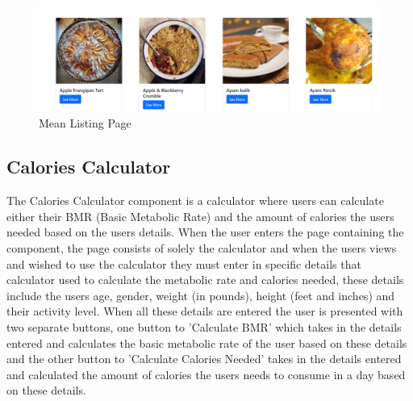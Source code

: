\begin{center}
  \begin{figure}[H]
    \includegraphics[width=\textwidth]{img/meallist.png}
    \caption{Mean Listing Page}
    \label{fig: Image of Meal Listing Page}
  \end{figure}
\end{center}

\subsection{Calories Calculator}

The Calories Calculator component is a calculator where users can calculate either their BMR (Basic Metabolic Rate) and the amount of calories the users needed based on the users details. When the user enters the page containing the component, the page consists of solely the calculator and when the users views and wished to use the calculator they must enter in specific details that calculator used to calculate the metabolic rate and calories needed, these details include the users age, gender, weight (in pounds), height (feet and inches) and their activity level. When all these details are entered the user is presented with two separate buttons, one button to 'Calculate BMR' which takes in the details entered and calculates the basic metabolic rate of the user based on these details and the other button to 'Calculate Calories Needed' takes in the details entered and calculated the amount of calories the users needs to consume in a day based on these details.

